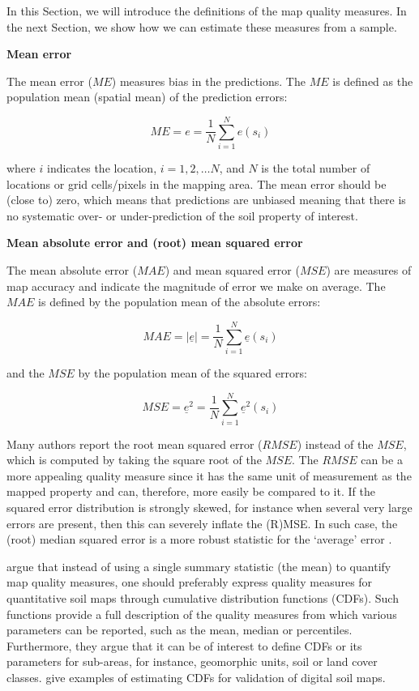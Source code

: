 \documentclass[10pt,b5paper,]{book}
\theoremstyle{definition}
\theoremstyle{definition}
\theoremstyle{definition}
\theoremstyle{remark}
\begin{document}
In this Section, we will introduce the definitions of the map quality
measures. In the next Section, we show how we can estimate these
measures from a sample.

\textbf{Mean error}

The mean error (\({ME}\)) measures bias in the predictions. The \({ME}\)
is defined as the population mean (spatial mean) of the prediction
errors:

\begin{equation}
M E = e = \frac{1}{N} \sum_{i=1}^{N} e (s_i)
\end{equation}

where \(i\) indicates the location, \({i = 1, 2,\dots N}\), and \(N\) is
the total number of locations or grid cells/pixels in the mapping area.
The mean error should be (close to) zero, which means that predictions
are unbiased meaning that there is no systematic over- or
under-prediction of the soil property of interest.

\textbf{Mean absolute error and (root) mean squared error}

The mean absolute error (\({MAE}\)) and mean squared error (\({MSE}\))
are measures of map accuracy and indicate the magnitude of error we make
on average. The \({MAE}\) is defined by the population mean of the
absolute errors:

\begin{equation}
M A E = |\underline{e}| = \frac{1}{N} \sum_{i=1}^{N} \underline{e} (s_i)
\end{equation}

and the \({MSE}\) by the population mean of the squared errors:

\begin{equation}
M S E = \underline{e}^2 = \frac{1}{N} \sum_{i=1}^{N} \underline{e}^2 (s_i)
\end{equation}

Many authors report the root mean squared error (\({RMSE}\)) instead of
the \({MSE}\), which is computed by taking the square root of the
\({MSE}\). The \({RMSE}\) can be a more appealing quality measure since
it has the same unit of measurement as the mapped property and can,
therefore, more easily be compared to it. If the squared error
distribution is strongly skewed, for instance when several very large
errors are present, then this can severely inflate the (R)MSE. In such
case, the (root) median squared error is a more robust statistic for the
`average' error \citep{kempen2012efficiency}.

\citet{brus2011sampling} argue that instead of using a single summary
statistic (the mean) to quantify map quality measures, one should
preferably express quality measures for quantitative soil maps through
cumulative distribution functions (CDFs). Such functions provide a full
description of the quality measures from which various parameters can be
reported, such as the mean, median or percentiles. Furthermore, they
argue that it can be of interest to define CDFs or its parameters for
sub-areas, for instance, geomorphic units, soil or land cover classes.
\citet{brus2011sampling} give examples of estimating CDFs for validation
of digital soil maps.
\end{document}
